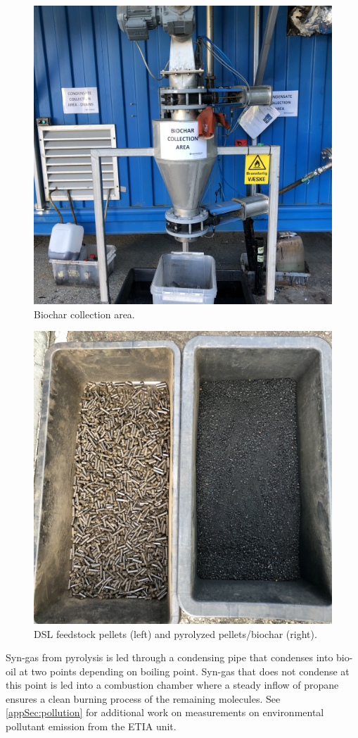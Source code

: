 \begin{figure}
    \centering
    \includegraphics[width=0.6\linewidth,scale=0.6]{Bilder/Pyrolysis/BiocharCollection.jpg}
    \caption{Biochar collection area.}
    \label{fig:biocharCollection}
\end{figure}

\begin{figure}
    \centering
    \includegraphics[width=0.6\linewidth,scale=0.6]{Bilder/Pyrolysis/Pellets.png}
    \caption{DSL feedstock pellets (left) and pyrolyzed pellets/biochar (right).}
    \label{fig:pellets}
\end{figure}

Syn-gas from pyrolysis is led through a condensing pipe that condenses into bio-oil at two points depending on boiling point. Syn-gas that does not condense at this point is led into a combustion chamber where a steady inflow of propane ensures a clean burning process of the remaining molecules. See \cref{appSec:pollution} for additional work on measurements on environmental pollutant emission from the ETIA unit.

